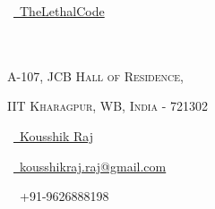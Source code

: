 \documentclass[a4paper,10pt]{extarticle} %
\begin{document}
\pagestyle{empty} %

\begin{multicols}{3}
\normalsize \faGithub\ {\href{https://github.com/TheLethalCode}{\  TheLethalCode}}\\
\normalsize {}\\
\normalsize {}\\
\columnbreak
\normalsize\par{\par} %
\par{\centering\normalsize {\textsc{A-107, JCB Hall of Residence, }}\hfill\par}
\vspace{-0.2cm}
\par{\centering\normalsize {\textsc{IIT Kharagpur, WB, India - 721302 }}\hfill\par}

\columnbreak
\raggedright\hfill\normalsize  \faLinkedinSquare\ {\href{https://www.linkedin.com/in/kousshik-raj-murali-b3976916a/}{\  Kousshik Raj}}\\
\raggedright\hfill\normalsize \faEnvelope\ {\href{mailto:kousshikraj.raj@gmail.com}{\  kousshikraj.raj@gmail.com}}\\
\raggedright\hfill{\faPhone\ \  +91-9626888198}
\end{multicols}


\vspace{-0.7cm}
\end{document}
